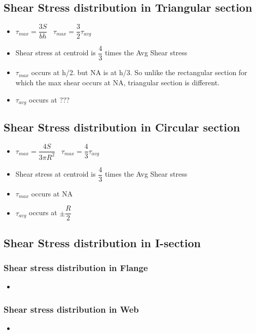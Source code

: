 \documentclass[8pt]{report}
\begin{document}
	\subsection{Shear Stress distribution in Triangular section}
		\begin{itemize}
			\item $\boxed{\tau_{max} = \dfrac{3S}{bh}}\;\;\;\boxed{\tau_{max} = \dfrac{3}{2}\tau_{avg}}$
			\item Shear stress at centroid is $\dfrac{4}{3}$ times the Avg Shear stress
			\item $\tau_{max}$ occurs at h/2. but NA is at h/3. So unlike the rectangular section for which the max shear occurs at NA, triangular section is different. 
			\item $\tau_{avg}$ occurs at ???
		\end{itemize}\hrulefill
	\subsection{Shear Stress distribution in Circular section}
		\begin{itemize}
			\item $\boxed{\tau_{max} = \dfrac{4S}{3\pi R^2}}\;\;\;\boxed{\tau_{max} = \dfrac{4}{3}\tau_{avg}}$
			\item Shear stress at centroid is $\dfrac{4}{3}$ times the Avg Shear stress
			\item $\tau_{max}$ occurs at NA
			\item $\tau_{avg}$ occurs at $\pm\dfrac{R}{2}$
		\end{itemize}\hrulefill
	\subsection{Shear Stress distribution in I-section}
		\subsubsection{Shear stress distribution in Flange}
			\begin{itemize}
				\item
			\end{itemize}
		\subsubsection{Shear stress distribution in Web}
			\begin{itemize}
				\item
			\end{itemize}\hrulefill
\end{document}
